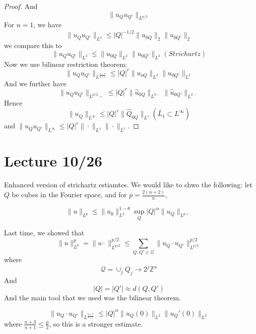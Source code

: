 \begin{proof}
    And
    \begin{equation*}
        \|u_Qu_{Q'}\|_{L^{p/2}}
    \end{equation*}
    For $n=1$, we have
    \begin{equation*}
        \|u_Qu_{Q'}\|_{L^2}\leq|Q|^{-1/2}\|u_{0Q}\|_2\|u_{0Q'}\|_2
    \end{equation*}
    we compare this to
    \begin{equation*}
        \|u_Qu_{Q'}\|_{L^3}\leq\|u_{0Q}\|_{L^2}\|u_{0Q'}\|_{L^2} (Strichartz)
    \end{equation*}
    Now we use bilinear restriction theorem:
    \begin{equation*}
        \|u_Qu_{Q'}\|_{L^\frac{n+3}{n+1}}\leq |Q|^r\|u_{oQ}\|_{L^2}\|u_{0Q'}\|_{L^2}
    \end{equation*}
    And we further have
    \begin{equation*}
        \|u_Qu_{Q'}\|_{L^{p/2}-}\leq|Q|^r\|\widehat{u}_{0Q}\|_{L^{2-}}\|\widehat{u}_{0Q'}\|_{L^{2-}}
    \end{equation*}
    Hence 
    \begin{equation*}
        \|u_Q\|_{L^\infty}\leq|Q|^r\|\widehat{Q}_{0Q}\|_{L^1} (\check{L_1}\subset L^\infty)
    \end{equation*}
    and $\|u_Qu_{Q'}\|_{L^\infty}\leq |Q|^r\|\cdot\|_{L^1}\|\cdot\|_{L^1}$.
\end{proof}

\section{Lecture 10/26}
Enhanced version of strichartz estiamtes.
We would like to shwo the following: let $Q$ be cubes in the Fourier space, and for $p=\frac{2(n+2)}{n}$,
\begin{theorem}
   \begin{equation*}
     \|u\|_{L^p}\leq\|u_0\|_{L^2}^{1-\theta}\sup_Q|Q|^\alpha\|u_Q\|_{L^{p+}}
   \end{equation*}
\end{theorem}
Last time, we showed that
\begin{equation*}
    \|u\|_{L^p}^p=\|u\cdot\|_{L^{p/2}}^{p/2}\leq\sum_{Q, Q'\in\mathcal{Q}}\|u_Q\cdot u_{Q'}\|_{L^{p/2}}^{p/2}
\end{equation*}
where
\begin{equation*}
    \mathcal{Q}=\cup_jQ_j\to 2^j\mathbb{Z}^n
\end{equation*}
And
\begin{equation*}
    |Q|=|Q'|\approx d(Q,Q')
\end{equation*}
And the main tool that we used was the bilinear theorem.
\begin{theorem}
    \begin{equation*}
        \|u_Q\cdot u_{Q'}\|_{L^\frac{n+3}{n+1}}\leq|Q|^\alpha\|u_Q(0)\|_{L^2}\|u_Q'(0)\|_{L^2}
    \end{equation*}
    where $\frac{n+3}{n+1}\leq\frac{p}{2}$, so this is a stronger estimate.
\end{theorem}

